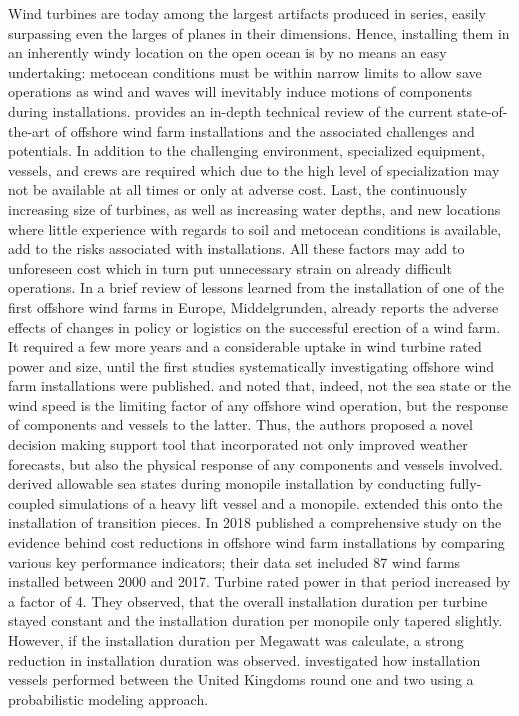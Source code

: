 \documentclass[wes, manuscript]{copernicus}
\begin{document}
Wind turbines are today among the largest artifacts produced in series, easily surpassing even the larges of planes
in their dimensions. Hence, installing them in an inherently windy location on the open ocean 
is by no means an easy undertaking: metocean conditions must be within narrow limits to allow save operations
as wind and waves will inevitably induce motions of components during installations. 
\citet{jiang_installation_2021} provides an in-depth technical review of the current state-of-the-art
of offshore wind farm installations and the associated challenges and potentials.
In addition to the challenging environment, specialized equipment, vessels, and crews are required
which due to the high level of specialization may not be available at all times or only at adverse
cost. Last, the continuously increasing size of turbines, as well as increasing water depths, and new locations 
where little experience with regards to soil and metocean conditions is available, add to 
the risks associated with installations. All these factors may add to unforeseen cost which in turn 
put unnecessary strain on already difficult operations. In a brief review of lessons learned from the 
installation of one of the first offshore wind farms in Europe, Middelgrunden, \citet{sorensen_experience_2001} 
already reports the adverse effects of changes in policy or logistics on the successful erection of a wind farm.
It required a few more years and a considerable uptake in wind turbine rated power and size, 
until the first studies systematically investigating offshore wind farm installations were published. 
\citet{gintautas_towards_2016} and \citet{gintautas_improved_2017} noted that, indeed, not the sea state or the wind speed is the limiting
factor of any offshore wind operation, but the response of components and vessels to the latter. Thus, the authors
proposed a novel decision making support tool that incorporated not only improved weather forecasts, but
also the physical response of any components and vessels involved. \citet{li_assessment_2016} derived allowable sea states
during monopile installation by conducting fully-coupled simulations of a heavy lift vessel and a monopile. \citet{acero_methodology_2017}
extended this onto the installation of transition pieces. 
In 2018 \citet{lacal-arantegui_offshore_2018} published a comprehensive study on the evidence behind cost reductions in offshore wind farm
installations by comparing various key performance indicators; their data set included 87 wind farms installed between 2000 and 2017. Turbine rated power in that period increased by a factor of 4. They observed, that the overall installation duration per turbine stayed constant and the installation duration per monopile only tapered slightly. However, if the installation duration per Megawatt was calculate, a strong reduction in installation duration was observed. \citet{paterson_offshore_2018} investigated how installation vessels performed between the United Kingdoms round one and two using a probabilistic modeling approach. 
\end{document}
